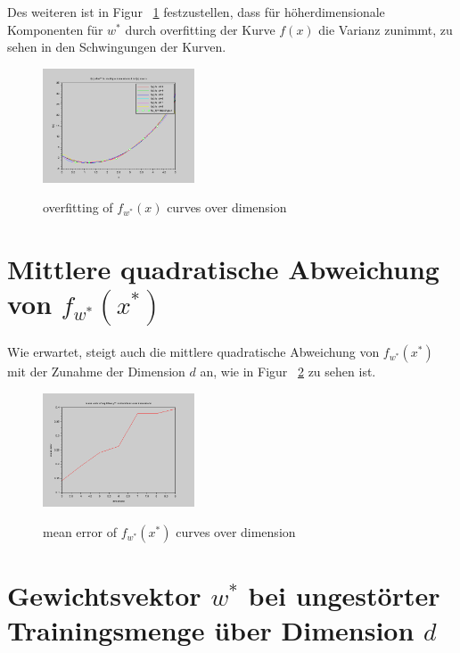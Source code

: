 \documentclass[]{report}
\begin{document}
Des weiteren ist in Figur ~\ref{fig:Overfitting} festzustellen, dass f\"ur h\"oherdimensionale Komponenten f\"ur $w^*$ durch overfitting der Kurve $f(x)$ die Varianz zunimmt, zu sehen in den Schwingungen der Kurven.

\begin{figure}[h]
\centering
\includegraphics[width=0.4\textwidth]{./images/f_x_w_star_overDimensions_stable.png} \\
\caption{overfitting of $f_{w^*}(x)$ curves over dimension}
\label{fig:Overfitting}
\end{figure}

\section{Mittlere quadratische Abweichung von $f_{w^*}(x^*)$}

Wie erwartet, steigt auch die mittlere quadratische Abweichung von $f_{w^*}(x^*)$ mit der Zunahme der Dimension $d$ an, wie in Figur ~\ref{fig:MeanError} zu sehen ist.

\begin{figure}[h]
\centering
\includegraphics[width=0.4\textwidth]{./images/MeanErrorOverDimensions.png} \\
\caption{mean error of $f_{w^*}(x^*)$ curves over dimension}
\label{fig:MeanError}
\end{figure}

\section{Gewichtsvektor $w^*$ bei ungest\"orter Trainingsmenge \"uber Dimension $d$}
\end{document}
